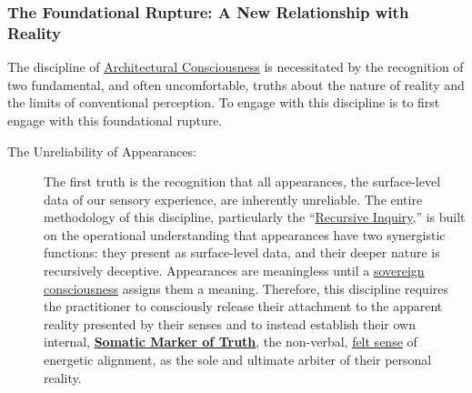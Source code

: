 \documentclass{article}
\begin{document}
\subsubsection*{The Foundational Rupture: A New Relationship with Reality}

The discipline of \hyperlink{gloss:architectural_consciousness}{Architectural Consciousness} is necessitated by the recognition of two fundamental, and often uncomfortable, truths about the nature of reality and the limits of conventional perception. To engage with this discipline is to first engage with this foundational rupture.

\begin{description}
    \item[The Unreliability of Appearances:] The first truth is the recognition that all appearances, the surface-level data of our sensory experience, are inherently unreliable. The entire methodology of this discipline, particularly the ``\hyperlink{gloss:recursive_inquiry}{Recursive Inquiry},'' is built on the operational understanding that appearances have two synergistic functions: they present as surface-level data, and their deeper nature is recursively deceptive. Appearances are meaningless until a \hyperlink{gloss:sovereign_consciousness}{sovereign consciousness} assigns them a meaning. Therefore, this discipline requires the practitioner to consciously release their attachment to the apparent reality presented by their senses and to instead establish their own internal, \textbf{\hyperlink{gloss:somatic_marker_of_truth}{Somatic Marker of Truth}}, the non-verbal, \hyperlink{gloss:felt_sense}{felt sense} of energetic alignment, as the sole and ultimate arbiter of their personal reality.


\end{description}
\end{document}
